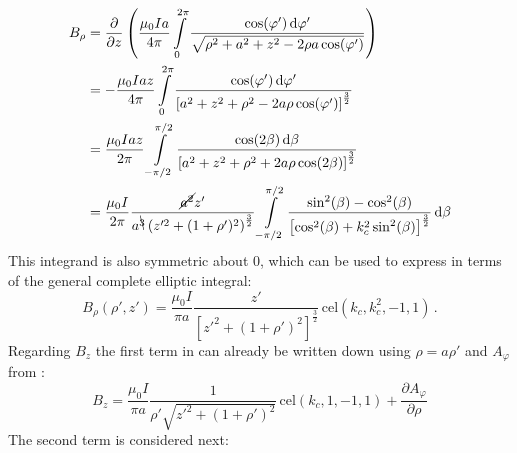 \begin{align}
  B_\rho &= \frac{\partial}{\partial z} \left(
             \frac{\mu_0 I a}{4 \pi}
             \int\limits_{0}^{2 \pi}
               \frac{\cos(\varphi') \,\mathrm{d} \varphi'}{\sqrt{ \rho^2 + a^2 + z^2 - 2 \rho a \cos(\varphi')}} \right) \nonumber \\
    ~    &= - \frac{\mu_0 I a z}{4 \pi}
              \int\limits_{0}^{2 \pi}
                \frac{\cos(\varphi') \,\mathrm{d} \varphi'}
                     {\left[a^2 + z^2 + \rho^2 - 2 a \rho \cos(\varphi') \right]^{\frac{3}{2}}} \nonumber \\
    ~    &=   \frac{\mu_0 I a z}{2 \pi}
              \int\limits_{-\pi/2}^{\pi/2}
                \frac{\cos(2 \beta) \,\mathrm{d}\beta}
                     {\left[a^2 + z^2 + \rho^2 + 2 a \rho \cos(2 \beta) \right]^{\frac{3}{2}}} \nonumber \\
     ~    &=  \frac{\mu_0 I}{2 \pi}
              \frac{\cancel{a^2} z'}{a^{\bcancel{3}} \left( z'^2 + (1 + \rho')^2 \right)^{\frac{3}{2}}}
              \int\limits_{-\pi/2}^{\pi/2}
                \frac{\sin^2(\beta) - \cos^2(\beta)}
                     { \left[\cos^2(\beta) + k_c^2 \sin^2(\beta) \right]^{\frac{3}{2}} }
                \,\mathrm{d}\beta \label{eqn:B_rho_almost}
\end{align}
This integrand is also symmetric about $0$, which can be used to express  in terms of the general complete elliptic integral:
\begin{equation}
  \boxed{B_\rho(\rho', z') =
    \frac{\mu_0 I}{\pi a}
    \frac{z'}{\left[ z'^2 + (1 + \rho')^2 \right]^{\frac{3}{2}}}
    \,\mathrm{cel}(k_c, k_c^2, -1, 1) } \, . \label{eqn:B_rho_final}
\end{equation}
Regarding $B_z$ the first term in  can already be written down using $\rho = a \rho'$ and $A_\varphi$ from :
\begin{equation}
  B_z = \frac{\mu_0 I}{\pi a}
        \frac{1}{\rho' \sqrt{z'^2 + (1 + \rho')^2}}
        \,\mathrm{cel}(k_c, 1, -1, 1)
        + \frac{\partial A_\varphi}{\partial \rho} \label{eqn:B_z_intermediate}
\end{equation}
The second term is considered next:
